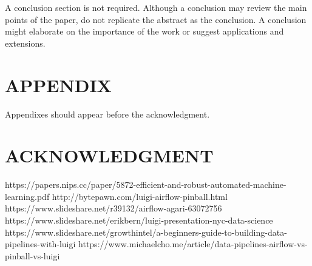 \documentclass[10pt,onecolumn]{IEEEtran}
\begin{document}
A conclusion section is not required. Although a conclusion may review the main points of the paper, do not replicate the abstract as the conclusion. A conclusion might elaborate on the importance of the work or suggest applications and extensions. 

\addtolength{\textheight}{-12cm}   %







\section*{APPENDIX}

Appendixes should appear before the acknowledgment.

\section*{ACKNOWLEDGMENT}

\begin{thebibliography}{99}

 https://papers.nips.cc/paper/5872-efficient-and-robust-automated-machine-learning.pdf
 http://bytepawn.com/luigi-airflow-pinball.html
 https://www.slideshare.net/r39132/airflow-agari-63072756
 https://www.slideshare.net/erikbern/luigi-presentation-nyc-data-science
 https://www.slideshare.net/growthintel/a-beginners-guide-to-building-data-pipelines-with-luigi
 https://www.michaelcho.me/article/data-pipelines-airflow-vs-pinball-vs-luigi

\end{thebibliography}
\end{document}
